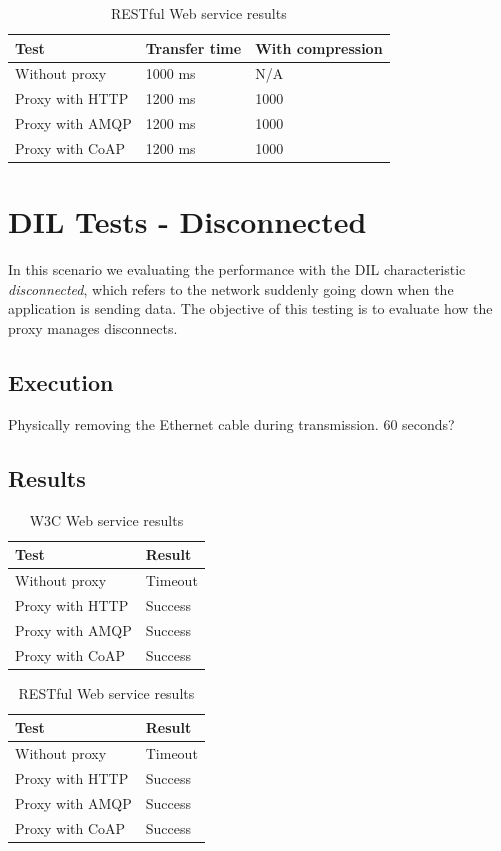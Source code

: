 \begin{table}[h!]
\begin{tabular}{| l | l | l |}
\hline
  \textbf{Test} & \textbf{Transfer time} & \textbf{With compression}\\ \hline
  Without proxy & 1000 ms & N/A \\ \hline
  Proxy with HTTP & 1200 ms & 1000\\ \hline
  Proxy with AMQP & 1200 ms & 1000\\ \hline
  Proxy with CoAP & 1200 ms & 1000\\ \hline
\end{tabular}
\caption{RESTful Web service results}
\end{table}


\section{DIL Tests - Disconnected}

In this scenario we evaluating the performance with the DIL characteristic
\textit{disconnected}, which refers to the network suddenly going down when the
application is sending data. The objective of this testing is to evaluate how
the proxy manages disconnects.

\subsection{Execution}

Physically removing the Ethernet cable during transmission. 60 seconds?

\subsection{Results}

\begin{table}[h!]
\begin{tabular}{| l | l |}
\hline
  \textbf{Test} & \textbf{Result} \\ \hline
  Without proxy & Timeout \\ \hline
  Proxy with HTTP & Success \\ \hline
  Proxy with AMQP & Success \\ \hline
  Proxy with CoAP & Success \\ \hline
\end{tabular}
\caption{W3C Web service results}
\end{table}

\begin{table}[h!]
\begin{tabular}{| l | l |}
\hline
  \textbf{Test} & \textbf{Result} \\ \hline
  Without proxy & Timeout \\ \hline
  Proxy with HTTP & Success \\ \hline
  Proxy with AMQP & Success \\ \hline
  Proxy with CoAP & Success \\ \hline
\end{tabular}
\caption{RESTful Web service results}
\end{table}

